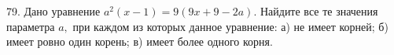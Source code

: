 79. Дано уравнение $a^2(x-1)=9(9x+9-2a).$ Найдите все те значения параметра $a,$ при каждом из которых данное уравнение: а) не имеет корней; б) имеет ровно один корень; в) имеет более одного корня.\\
